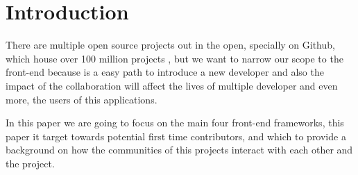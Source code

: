 \section{Introduction}

There are multiple open source projects out in the open, specially on Github, which house over 100 million projects \cite{intro}, but we want to narrow  our scope to the front-end because is a easy path to introduce a new developer and also the impact of the collaboration will affect the lives  of multiple developer and even more, the users of this applications.

In this paper we are going to focus on the main four front-end frameworks, this paper it target towards potential first time contributors, and which to provide a background on how the communities of this projects interact with each other and the project.